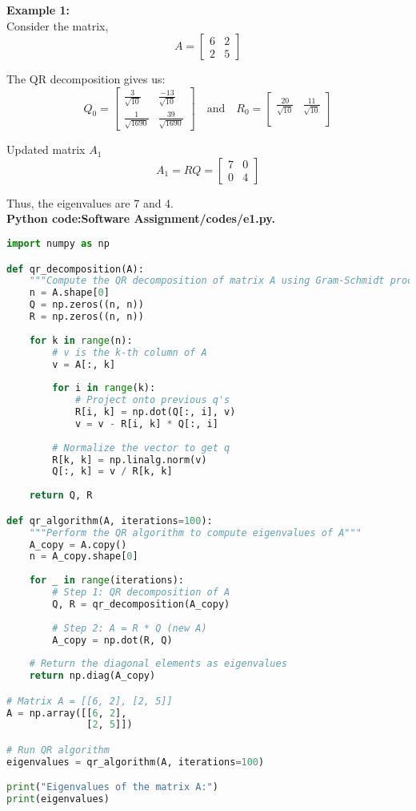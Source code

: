 \documentclass[journal]{IEEEtran}
\begin{document}
\textbf{Example 1:}\\
Consider the matrix, 
\[
	A= \begin{bmatrix}
		6 & 2\\
		2 & 5
	\end{bmatrix}
\]

The QR decomposition gives us:
\[
Q_0 = \begin{bmatrix}
	\frac{3}{\sqrt{10}} & \frac{-13}{\sqrt{10}} \\
	\frac{1}{\sqrt{1690}} & \frac{39}{\sqrt{1690}}
\end{bmatrix}
\quad \text{and} \quad
R_0 = \begin{bmatrix}
	\frac{20}{\sqrt{10}} & \frac{11}{\sqrt{10}} \\
\end{bmatrix}
\]

Updated matrix \(A_1\)
\[
	A_1=RQ=\begin{bmatrix}
		7 & 0\\
		0 & 4
	\end{bmatrix}
\]

Thus, the eigenvalues are 7 and 4.\\
\textbf{Python code:Software Assignment/codes/e1.py.}\\
\begin{lstlisting}[language=Python, caption=QR Algorithm Python]
import numpy as np

def qr_decomposition(A):
    """Compute the QR decomposition of matrix A using Gram-Schmidt process"""
    n = A.shape[0]
    Q = np.zeros((n, n))
    R = np.zeros((n, n))
    
    for k in range(n):
        # v is the k-th column of A
        v = A[:, k]
        
        for i in range(k):
            # Project onto previous q's
            R[i, k] = np.dot(Q[:, i], v)
            v = v - R[i, k] * Q[:, i]
        
        # Normalize the vector to get q
        R[k, k] = np.linalg.norm(v)
        Q[:, k] = v / R[k, k]
    
    return Q, R

def qr_algorithm(A, iterations=100):
    """Perform the QR algorithm to compute eigenvalues of A"""
    A_copy = A.copy()
    n = A_copy.shape[0]
    
    for _ in range(iterations):
        # Step 1: QR decomposition of A
        Q, R = qr_decomposition(A_copy)
      
        # Step 2: A = R * Q (new A)
        A_copy = np.dot(R, Q)
    
    # Return the diagonal elements as eigenvalues
    return np.diag(A_copy)

# Matrix A = [[6, 2], [2, 5]]
A = np.array([[6, 2],
              [2, 5]])

# Run QR algorithm
eigenvalues = qr_algorithm(A, iterations=100)

print("Eigenvalues of the matrix A:")
print(eigenvalues)
\end{lstlisting}
\end{document}
